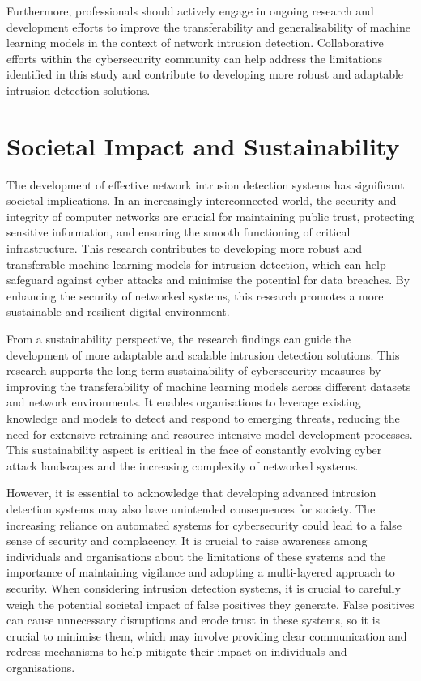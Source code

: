 Furthermore, professionals should actively engage in ongoing research and development efforts to improve the transferability and generalisability of machine learning models in the context of network intrusion detection. Collaborative efforts within the cybersecurity community can help address the limitations identified in this study and contribute to developing more robust and adaptable intrusion detection solutions.

\section{Societal Impact and Sustainability}
The development of effective network intrusion detection systems has significant societal implications. In an increasingly interconnected world, the security and integrity of computer networks are crucial for maintaining public trust, protecting sensitive information, and ensuring the smooth functioning of critical infrastructure. This research contributes to developing more robust and transferable machine learning models for intrusion detection, which can help safeguard against cyber attacks and minimise the potential for data breaches. By enhancing the security of networked systems, this research promotes a more sustainable and resilient digital environment.

From a sustainability perspective, the research findings can guide the development of more adaptable and scalable intrusion detection solutions. This research supports the long-term sustainability of cybersecurity measures by improving the transferability of machine learning models across different datasets and network environments. It enables organisations to leverage existing knowledge and models to detect and respond to emerging threats, reducing the need for extensive retraining and resource-intensive model development processes. This sustainability aspect is critical in the face of constantly evolving cyber attack landscapes and the increasing complexity of networked systems.

However, it is essential to acknowledge that developing advanced intrusion detection systems may also have unintended consequences for society. The increasing reliance on automated systems for cybersecurity could lead to a false sense of security and complacency. It is crucial to raise awareness among individuals and organisations about the limitations of these systems and the importance of maintaining vigilance and adopting a multi-layered approach to security. When considering intrusion detection systems, it is crucial to carefully weigh the potential societal impact of false positives they generate. False positives can cause unnecessary disruptions and erode trust in these systems, so it is crucial to minimise them, which may involve providing clear communication and redress mechanisms to help mitigate their impact on individuals and organisations.

